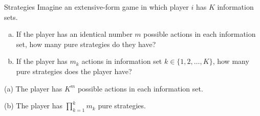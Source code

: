 \documentclass[10pt]{extarticle}
\title{}
\author{Avinash Iyer}
\date{}
\begin{document}
  \begin{problem}{Strategies}
    Imagine an extensive-form game in which player $i$ has $K$ information sets.
    \begin{enumerate}[(a)]
      \item If the player has an identical number $m$ possible actions in each information set, how many pure strategies do they have?
      \item If the player has $m_k$ actions in information set $k\in \{1,2,\dots,K\}$, how many pure strategies does the player have?
    \end{enumerate}
    \tcblower
    \begin{problem}{(a)}
      The player has $K^{m}$ possible actions in each information set.
    \end{problem}
    \begin{problem}{(b)}
      The player has $\prod_{k=1}^{k}m_k$ pure strategies.
    \end{problem}
  \end{problem}
\end{document}
